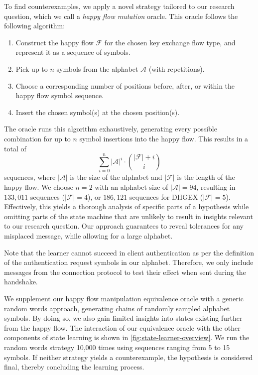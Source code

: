 To find counterexamples, we apply a novel strategy tailored to our research question, which we call a \emph{happy flow mutation} oracle. This oracle follows the following algorithm:
\begin{enumerate}
    \item Construct the happy flow $\mathcal{F}$ for the chosen key exchange flow type, and represent it as a sequence of symbols.
    \item Pick up to $n$ symbols from the alphabet $\mathcal{A}$  (with repetitions).
    \item Choose a corresponding number of positions before, after, or within the happy flow symbol sequence.
    \item Insert the chosen symbol(s) at the chosen position(s).
\end{enumerate}
The oracle runs this algorithm exhaustively, generating every possible combination for up to $n$ symbol insertions into the happy flow. This results in a total of \[\sum_{i = 0}^n |\mathcal{A}|^i\cdot\binom{|\mathcal{F}| + i}{i} \] sequences, where $|\mathcal{A}|$ is the size of the alphabet and $|\mathcal{F}|$ is the length of the happy flow. We choose $n = 2$ with an alphabet size of $|\mathcal{A}| = 94$, resulting in $133{,}011$ sequences ($|\mathcal{F}| = 4$), or $186{,}121$ sequences for DHGEX ($|\mathcal{F}| = 5$). Effectively, this yields a thorough analysis of specific parts of a hypothesis while omitting parts of the state machine that are unlikely to result in insights relevant to our research question. Our approach guarantees to reveal tolerances for any misplaced message, while allowing for a large alphabet.

Note that the learner cannot succeed in client authentication as per the definition of the authentication request symbols in our alphabet. Therefore, we only include messages from the connection protocol to test their effect when sent during the handshake.

We supplement our happy flow manipulation equivalence oracle with a generic random words approach, generating chains of randomly sampled alphabet symbols. By doing so, we also gain limited insights into states existing further from the happy flow. The interaction of our equivalence oracle with the other components of state learning is shown in \autoref{fig:state-learner-overview}. We run the random words strategy 10,000 times using sequences ranging from 5 to 15 symbols. If neither strategy yields a counterexample, the hypothesis is considered final, thereby concluding the learning process.


